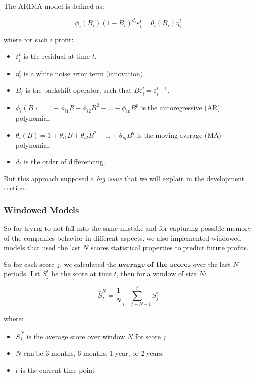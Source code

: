 \documentclass[11pt,english,a4paper,hidelinks]{book}
\begin{document}
\noindent The ARIMA model is defined as:

\begin{equation}
    \phi_i(B_i)(1 - B_i)^{d_i} \varepsilon_i^t = \theta_i(B_i) \eta_i^t
    \end{equation}
    
    \noindent where for each $i$ profit:
    \begin{itemize}
      \item \(\varepsilon_i^t\) is the residual at time \(t\).
      \item \(\eta_i^t\) is a white noise error term (innovation).
      \item \(B_i\) is the backshift operator, such that \(B \varepsilon_i^t = \varepsilon_i^{t-1}\).
      \item \(\phi_i(B) = 1 - \phi_{i1} B - \phi_{i2} B^2 - \dots - \phi_{ip} B^p\) is the autoregressive (AR) polynomial.
      \item \(\theta_i(B) = 1 + \theta_{i1} B + \theta_{i2} B^2 + \dots + \theta_{iq} B^q\) is the moving average (MA) polynomial.
      \item \(d_i\) is the order of differencing.
    \end{itemize}
    
\noindent But this approach supposed a \textit{big issue} that we will explain in the development section.

\subsubsection{Windowed Models}
So for trying to not fall into the same mistake and for capturing possible memory of the companies behavior in different aspects, we also implemented windowed models that used the last \(N\) scores statistical properties to predict future profits.

\vspace{0.5cm}
\noindent So for each score \(j\), we calculated the \textbf{average of the scores} over the last \(N\) periods. Let \(S_j^t\) be the score at time \(t\), then for a window of size \(N\):

\begin{equation}
    \bar{S}_j^N = \frac{1}{N} \sum_{i=t-N+1}^{t} S_j^i
\end{equation}

\noindent where:
\begin{itemize}
    \item \(\bar{S}_j^N\) is the average score over window \(N\) for score \(j\)
    \item \(N\) can be 3 months, 6 months, 1 year, or 2 years.
    \item \(t\) is the current time point
\end{itemize}
\end{document}
